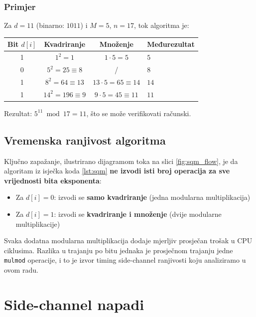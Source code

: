 \subsubsection{Primjer}

Za $d = 11$ (binarno: $1011$) i $M = 5$, $n = 17$, tok algoritma je:

\begin{center}
\begin{tabular}{cccl}
\toprule
Bit $d[i]$ & Kvadriranje & Množenje & Međurezultat \\
\midrule
1 & $1^2 = 1$ & $1 \cdot 5 = 5$ & $5$ \\
0 & $5^2 = 25 \equiv 8$ & / & $8$ \\
1 & $8^2 = 64 \equiv 13$ & $13 \cdot 5 = 65 \equiv 14$ & $14$ \\
1 & $14^2 = 196 \equiv 9$ & $9 \cdot 5 = 45 \equiv 11$ & $11$ \\
\bottomrule
\end{tabular}
\end{center}

\noindent Rezultat: $5^{11} \bmod 17 = 11$, što se može verifikovati računski.

\subsection{Vremenska ranjivost algoritma}

Ključno zapažanje, ilustrirano dijagramom toka na slici \ref{fig:sqm_flow}, je da algoritam iz isječka koda \ref{lst:sqm} \textbf{ne izvodi isti broj operacija za sve vrijednosti bita eksponenta}:

\begin{itemize}
\item Za $d[i] = 0$: izvodi se \textbf{samo kvadriranje} (jedna modularna multiplikacija)
\item Za $d[i] = 1$: izvodi se \textbf{kvadriranje i množenje} (dvije modularne multiplikacije)
\end{itemize}

Svaka dodatna modularna multiplikacija dodaje mjerljiv prosječan trošak u CPU ciklusima. Razlika u trajanju po bitu jednaka je prosječnom trajanju jedne \texttt{mulmod} operacije, i to je izvor timing side-channel ranjivosti koju analiziramo u ovom radu.

\section{Side-channel napadi}

